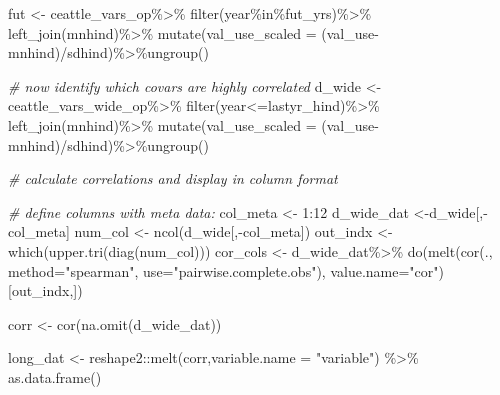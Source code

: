 \documentclass[
]{article}
\newenvironment{Shaded}{\begin{snugshade}}{\end{snugshade}}
\newcommand{\AttributeTok}[1]{\textcolor[rgb]{0.77,0.63,0.00}{#1}}
\newcommand{\CommentTok}[1]{\textcolor[rgb]{0.56,0.35,0.01}{\textit{#1}}}
\newcommand{\DecValTok}[1]{\textcolor[rgb]{0.00,0.00,0.81}{#1}}
\newcommand{\FunctionTok}[1]{\textcolor[rgb]{0.00,0.00,0.00}{#1}}
\newcommand{\NormalTok}[1]{#1}
\newcommand{\OtherTok}[1]{\textcolor[rgb]{0.56,0.35,0.01}{#1}}
\newcommand{\SpecialCharTok}[1]{\textcolor[rgb]{0.00,0.00,0.00}{#1}}
\newcommand{\StringTok}[1]{\textcolor[rgb]{0.31,0.60,0.02}{#1}}
\begin{document}
\begin{Shaded}
\begin{Highlighting}[]
\NormalTok{fut  }\OtherTok{\textless{}{-}}\NormalTok{ ceattle\_vars\_op}\SpecialCharTok{\%\textgreater{}\%}
  \FunctionTok{filter}\NormalTok{(year}\SpecialCharTok{\%in\%}\NormalTok{fut\_yrs)}\SpecialCharTok{\%\textgreater{}\%}
  \FunctionTok{left\_join}\NormalTok{(mnhind)}\SpecialCharTok{\%\textgreater{}\%}
  \FunctionTok{mutate}\NormalTok{(}\AttributeTok{val\_use\_scaled =}\NormalTok{ (val\_use}\SpecialCharTok{{-}}\NormalTok{mnhind)}\SpecialCharTok{/}\NormalTok{sdhind)}\SpecialCharTok{\%\textgreater{}\%}\FunctionTok{ungroup}\NormalTok{()}
  

\CommentTok{\# now identify which covars are highly correlated}
\NormalTok{d\_wide   }\OtherTok{\textless{}{-}}\NormalTok{ ceattle\_vars\_wide\_op}\SpecialCharTok{\%\textgreater{}\%}
  \FunctionTok{filter}\NormalTok{(year}\SpecialCharTok{\textless{}=}\NormalTok{lastyr\_hind)}\SpecialCharTok{\%\textgreater{}\%}
  \FunctionTok{left\_join}\NormalTok{(mnhind)}\SpecialCharTok{\%\textgreater{}\%}
  \FunctionTok{mutate}\NormalTok{(}\AttributeTok{val\_use\_scaled =}\NormalTok{ (val\_use}\SpecialCharTok{{-}}\NormalTok{mnhind)}\SpecialCharTok{/}\NormalTok{sdhind)}\SpecialCharTok{\%\textgreater{}\%}\FunctionTok{ungroup}\NormalTok{()}

\CommentTok{\# calculate correlations and display in column format}

\CommentTok{\# define columns with meta data:}
\NormalTok{col\_meta }\OtherTok{\textless{}{-}} \DecValTok{1}\SpecialCharTok{:}\DecValTok{12}
\NormalTok{d\_wide\_dat }\OtherTok{\textless{}{-}}\NormalTok{d\_wide[,}\SpecialCharTok{{-}}\NormalTok{col\_meta]}
\NormalTok{num\_col  }\OtherTok{\textless{}{-}} \FunctionTok{ncol}\NormalTok{(d\_wide[,}\SpecialCharTok{{-}}\NormalTok{col\_meta])}
\NormalTok{out\_indx }\OtherTok{\textless{}{-}} \FunctionTok{which}\NormalTok{(}\FunctionTok{upper.tri}\NormalTok{(}\FunctionTok{diag}\NormalTok{(num\_col))) }
\NormalTok{cor\_cols }\OtherTok{\textless{}{-}}\NormalTok{ d\_wide\_dat}\SpecialCharTok{\%\textgreater{}\%}
  \FunctionTok{do}\NormalTok{(}\FunctionTok{melt}\NormalTok{(}\FunctionTok{cor}\NormalTok{(., }
              \AttributeTok{method=}\StringTok{"spearman"}\NormalTok{, }
              \AttributeTok{use=}\StringTok{"pairwise.complete.obs"}\NormalTok{),}
          \AttributeTok{value.name=}\StringTok{"cor"}\NormalTok{)[out\_indx,])}

\NormalTok{corr     }\OtherTok{\textless{}{-}} \FunctionTok{cor}\NormalTok{(}\FunctionTok{na.omit}\NormalTok{(d\_wide\_dat))}

\NormalTok{long\_dat }\OtherTok{\textless{}{-}}\NormalTok{ reshape2}\SpecialCharTok{::}\FunctionTok{melt}\NormalTok{(corr,}\AttributeTok{variable.name =} \StringTok{"variable"}\NormalTok{) }\SpecialCharTok{\%\textgreater{}\%} 
  \FunctionTok{as.data.frame}\NormalTok{() }


\end{Highlighting}
\end{Shaded}
\end{document}
